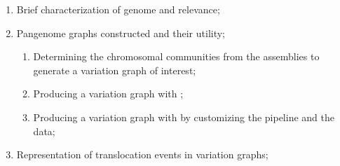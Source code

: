 \begin{enumerate}
	\item Brief characterization of \lodelo genome and relevance;
	\item Pangenome graphs constructed and their utility;
	\begin{enumerate}
		\item Determining the chromosomal communities from the assemblies to generate a variation graph of interest;
		\item Producing a variation graph with \pggb;
		\item Producing a variation graph with \mcactus by customizing the pipeline and the data;
	\end{enumerate}
	\item Representation of translocation events in variation graphs;
\end{enumerate}


